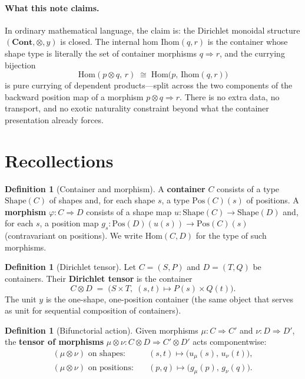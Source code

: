 \documentclass[11pt,a4paper]{article}
\theoremstyle{plain}
\theoremstyle{definition}
\newtheorem{definition}[theorem]{Definition}
\newcommand{\Shape}{\mathrm{Shape}}
\newcommand{\Pos}{\mathrm{Pos}}
\newcommand{\Ihom}{\mathrm{Ihom}}
\newcommand{\Cont}{\mathbf{Cont}}
\newcommand{\Hom}{\mathrm{Hom}}
\begin{document}
\paragraph{What this note claims.}
In ordinary mathematical language, the claim is: the Dirichlet monoidal
structure $(\Cont, \otimes, y)$ is closed. The internal hom
$\Ihom(q,r)$ is the container whose shape type is literally the set of
container morphisms $q \Rightarrow r$, and the currying bijection
\begin{equation}
  \Hom(p \otimes q,\, r)
  \;\cong\;
  \Hom\bigl(p,\, \Ihom(q,r)\bigr)
\end{equation}
is pure currying of dependent products---split across the two components of
the backward position map of a morphism $p \otimes q \Rightarrow r$. There
is no extra data, no transport, and no exotic naturality constraint beyond
what the container presentation already forces.

\section{Recollections}

\begin{definition}[Container and morphism]
A \textbf{container} $C$ consists of a type $\Shape(C)$ of shapes and, for
each shape $s$, a type $\Pos(C)(s)$ of positions. A \textbf{morphism}
$\varphi : C \Rightarrow D$ consists of a shape map
$u : \Shape(C) \to \Shape(D)$ and, for each $s$, a position map
$g_s : \Pos(D)(u(s)) \to \Pos(C)(s)$ (contravariant on positions). We write
$\Hom(C,D)$ for the type of such morphisms.
\end{definition}

\begin{definition}[Dirichlet tensor]\label{def:dirichlet}
Let $C = (S,P)$ and $D = (T,Q)$ be containers. Their \textbf{Dirichlet
tensor} is the container
\begin{equation}
  C \otimes D \;=\;
  \bigl(
    S \times T,\;
    (s,t) \mapsto P(s) \times Q(t)
  \bigr).
\end{equation}
The unit $y$ is the one-shape, one-position container (the same object that
serves as unit for sequential composition of containers).
\end{definition}

\begin{definition}[Bifunctorial action]\label{def:dir2}
Given morphisms $\mu : C \Rightarrow C'$ and $\nu : D \Rightarrow D'$, the
\textbf{tensor of morphisms}
$\mu \otimes \nu : C \otimes D \Rightarrow C' \otimes D'$ acts
componentwise:
\begin{align}
  (\mu \otimes \nu)\text{ on shapes:}
  &\quad (s,t) \mapsto \bigl(u_\mu(s),\, u_\nu(t)\bigr), \\
  (\mu \otimes \nu)\text{ on positions:}
  &\quad (p,q) \mapsto \bigl(g_\mu(p),\, g_\nu(q)\bigr).
\end{align}
\end{definition}
\end{document}
